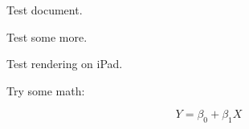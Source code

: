 \documentclass{article}
\begin{document}
Test document.

Test some more.

Test rendering on iPad.

Try some math: 

\begin{equation*}
	Y = \beta_0 + \beta_1 X
\end{equation*}
\end{document}
